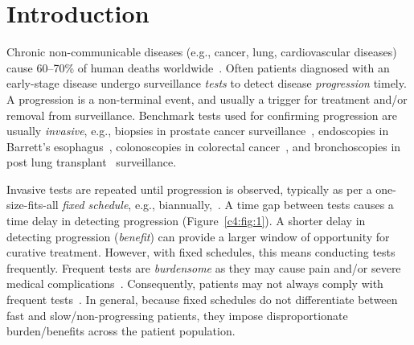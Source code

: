 \section{Introduction}
\label{c4:sec:introduction}
Chronic non-communicable diseases (e.g., cancer, lung, cardiovascular diseases) cause 60--70\% of human deaths worldwide~\citep{world2014global}. Often patients diagnosed with an early-stage disease undergo surveillance \emph{tests} to detect disease \emph{progression} timely. A progression is a non-terminal event, and usually a trigger for treatment and/or removal from surveillance. Benchmark tests used for confirming progression are usually \emph{invasive}, e.g., biopsies in prostate cancer surveillance~\citep{bokhorst2015compliance}, endoscopies in Barrett's esophagus~\citep{weusten2017endoscopic}, colonoscopies in colorectal cancer~\citep{krist2007timing}, and bronchoscopies in post lung transplant~\citep{mcwilliams2008surveillance} surveillance.

Invasive tests are repeated until progression is observed, typically as per a one-size-fits-all \emph{fixed schedule}, e.g., biannually,~\citep{krist2007timing,mcwilliams2008surveillance,bokhorst2015compliance}. A time gap between tests causes a time delay in detecting progression (Figure~\ref{c4:fig:1}). A shorter delay in detecting progression (\emph{benefit}) can provide a larger window of opportunity for curative treatment. However, with fixed schedules, this means conducting tests frequently. Frequent tests are \textit{burdensome} as they may cause pain and/or severe medical complications~\citep{krist2007timing,loeb2013systematic}. Consequently, patients may not always comply with frequent tests~\citep{bokhorst2015compliance, LeClercq2015325}. In general, because fixed schedules do not differentiate between fast and slow/non-progressing patients, they impose disproportionate burden/benefits across the patient population.

